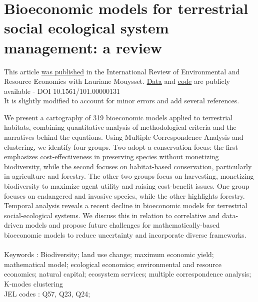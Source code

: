 \chapter{Bioeconomic models for terrestrial social ecological system management: a review}

\label{chapter1}

\begin{center}
\begin{minipage}{0.9\textwidth}
\singlespacing
This article \href{https://sim-jean.github.io/files/research/jean_mouysset2022.pdf}{was published} in the International Review of Environmental and Resource Economics with Lauriane Mouysset. \href{https://zenodo.org/records/6656433}{Data} and \href{https://github.com/sim-jean/review-irere/tree/main}{code} are publicly available - DOI 10.1561/101.00000131\\
It is slightly modified to account for minor errors and add several references.
\end{minipage}

\vspace*{.5cm}


\begin{minipage}{0.9\textwidth}
\singlespacing
We present a cartography of 319 bioeconomic models applied to terrestrial habitats, combining quantitative analysis of methodological criteria and the narratives behind the equations. Using Multiple Correspondence Analysis and clustering, we identify four groups. Two adopt a conservation focus: the first emphasizes cost-effectiveness in preserving species without monetizing biodiversity, while the second focuses on habitat-based conservation, particularly in agriculture and forestry. The other two groups focus on harvesting, monetizing biodiversity to maximize agent utility and raising cost-benefit issues. One group focuses on endangered and invasive species, while the other highlights forestry. Temporal analysis reveals a recent decline in bioeconomic models for terrestrial social-ecological systems. We discuss this in relation to correlative and data-driven models and propose future challenges for mathematically-based bioeconomic models to reduce uncertainty and incorporate diverse frameworks.
\\\\
Keywords : Biodiversity; land use change; maximum economic yield; mathematical model; ecological economics; environmental and resource economics; natural capital; ecosystem services; multiple correspondence analysis; K-modes clustering\\
JEL codes : Q57, Q23, Q24;
\end{minipage}
\end{center}
    \vfill
\newpage

